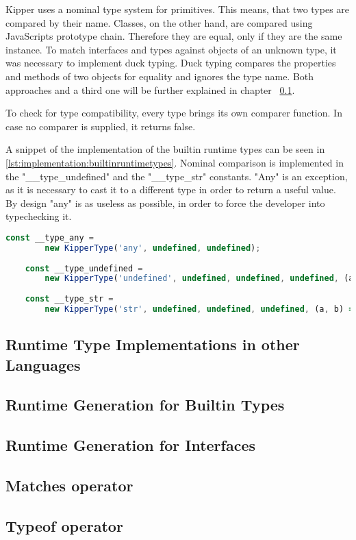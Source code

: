  Kipper uses a nominal type system for primitives. This means, that two types are compared by their name. Classes, on the other hand, are compared using JavaScripts prototype chain. Therefore they are equal, only if they are the same instance.   To match interfaces and types against objects of an unknown type, it was necessary to implement duck typing. Duck typing compares the properties and methods of two objects for equality and ignores the type name. Both approaches and a third one will be further explained in chapter ~\ref{chap:runtime-other-languages}. 

To check for type compatibility, every type brings its own comparer function. In case no comparer is supplied, it returns false.

 A snippet of the implementation of the builtin runtime types can be seen in \ref{lst:implementation:builtinruntimetypes}. Nominal comparison is implemented in the "\_\_type\_undefined" and the "\_\_type\_str" constants. "Any" is an exception, as it is necessary to cast it to a different type in order to return a useful value. By design "any" is as useless as possible, in order to force the developer into typechecking it.

\begin{lstlisting}[language=TypeScript,caption=The builtin runtime types,label=lst:implementation:builtinruntimetypes]
	const __type_any = 
		new KipperType('any', undefined, undefined);
		
	const __type_undefined = 
		new KipperType('undefined', undefined, undefined, undefined, (a, b) => a.name === b.name);
		
	const __type_str = 
		new KipperType('str', undefined, undefined, undefined, (a, b) => a.name === b.name);
\end{lstlisting}

\subsection{Runtime Type Implementations in other Languages}
\label{chap:runtime-other-languages}




\subsection{Runtime Generation for Builtin Types}

\subsection{Runtime Generation for Interfaces}

\subsection{Matches operator}

\subsection{Typeof operator}
